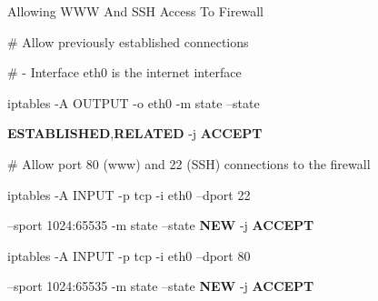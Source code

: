 \begin{frame}[t,allowframebreaks]{Allowing WWW And SSH Access To Firewall}
  \fontsize{15}{18}\selectfont
  \vspace{0.08cm}
  {\color{CommandGreen}\ttfamily\fontsize{13.5}{16.5}\selectfont \# Allow previously established connections\par}
  \vspace{0.08cm}
  {\color{CommandGreen}\ttfamily\fontsize{13.5}{16.5}\selectfont \# - Interface eth0 is the internet interface\par}
  \vspace{0.08cm}
  {\color{CommandGreen}\ttfamily\fontsize{13.5}{16.5}\selectfont iptables -A OUTPUT -o eth0 -m state --state\par}
  \textcolor{WarningColor}{\bfseries ESTABLISHED},\textcolor{WarningColor}{\bfseries RELATED} -j \textcolor{WarningColor}{\bfseries ACCEPT}\par
  \vspace{0.08cm}
  {\color{CommandGreen}\ttfamily\fontsize{13.5}{16.5}\selectfont \# Allow port 80 (www) and 22 (SSH) connections to the firewall\par}
  \vspace{0.08cm}
  {\color{CommandGreen}\ttfamily\fontsize{13.5}{16.5}\selectfont iptables -A INPUT -p tcp -i eth0 --dport 22\par}
  --sport 1024:65535 -m state --state \textcolor{WarningColor}{\bfseries NEW} -j \textcolor{WarningColor}{\bfseries ACCEPT}\par
  \vspace{0.08cm}
  {\color{CommandGreen}\ttfamily\fontsize{13.5}{16.5}\selectfont iptables -A INPUT -p tcp -i eth0 --dport 80\par}
  --sport 1024:65535 -m state --state \textcolor{WarningColor}{\bfseries NEW} -j \textcolor{WarningColor}{\bfseries ACCEPT}\par
\end{frame}
